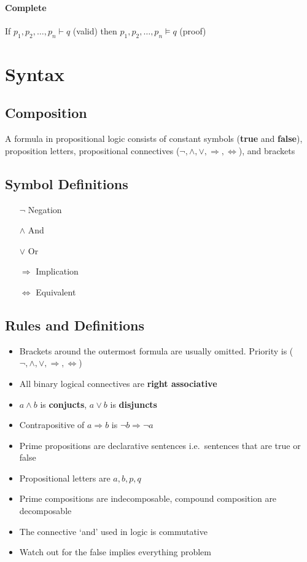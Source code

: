       \paragraph{Complete} If $p_1, p_2,\ldots,p_n \vdash q$ (valid) then
      $p_1,p_2,\ldots,p_n \models q$ (proof)
  \section{Syntax}
    \subsection{Composition}
      A formula in propositional logic consists of constant symbols
      (\textbf{true} and \textbf{false}), proposition letters, propositional
      connectives ($\lnot, \land, \lor, \Rightarrow, \Leftrightarrow$), and
      brackets

    \subsection{Symbol Definitions}
      \begin{itemize}
        \item[$\lnot$] Negation
        \item[$\land$] And
        \item[$\lor$] Or
        \item[$\Rightarrow$] Implication
        \item[$\Leftrightarrow$] Equivalent
      \end{itemize}

    \subsection{Rules and Definitions}
      \begin{itemize}
        \item Brackets around the outermost formula are usually omitted.
          Priority is ($\lnot, \land, \lor, \Rightarrow, \Leftrightarrow$)
        \item All binary logical connectives are \textbf{right associative}
        \item $a\land b$ is \textbf{conjucts}, $a\lor b$ is \textbf{disjuncts}
        \item Contrapositive of $a\Rightarrow b$ is $\lnot b\Rightarrow \lnot
          a$
        \item Prime propositions are declarative sentences i.e.\ sentences that
          are true or false
        \item Propositional letters are $a, b, p, q$
        \item Prime compositions are indecomposable, compound composition are
          decomposable
        \item The connective `and' used in logic is commutative
        \item Watch out for the false implies everything problem

      \end{itemize}
